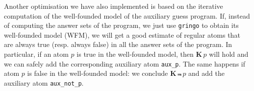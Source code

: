 \documentclass{new_tlp}
\newcommand{\textapprox}{\raisebox{0.5ex}{\texttildelow}}
\def\K{\mathbf{K}\, }
\begin{document}
Another optimisation we have also implemented is based on the iterative computation of the well-founded model of the auxiliary guess program.
%
%
If, instead of computing the answer sets of the program, we just use {\tt gringo} to obtain its well-founded model (WFM), we will get a good estimate of regular atoms that are always true (resp. always false) in all the answer sets of the program.
In particular, if an atom $p$ is true in the well-founded model, then $\K p$ will hold and we can safely add the corresponding auxiliary atom {\tt aux\_p}.
The same happens if atom $p$ is false in the well-founded model: we conclude $\K \Not \, p$ and add the auxiliary atom {\tt aux\_not\_p}.
\end{document}

